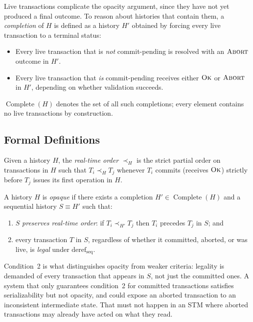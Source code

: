 Live transactions complicate the opacity argument, since they have not yet
produced a final outcome. To reason about histories that contain them, a
\emph{completion} of $H$ is defined as a history $H'$ obtained by forcing
every live transaction to a terminal status:

\begin{itemize}
  \item Every live transaction that is \emph{not} commit-pending is resolved
        with an $\textsc{Abort}$ outcome in $H'$.
  \item Every live transaction that \emph{is} commit-pending receives either
        $\textsc{Ok}$ or $\textsc{Abort}$ in $H'$, depending on whether
        validation succeeds.
\end{itemize}

$\operatorname{Complete}(H)$ denotes the set of all such completions; every
element contains no live transactions by construction.

\subsection{Formal Definitions}
\label{subsec:opacity-defs}

\begin{definition}
  \label{def:rt-order}
  Given a history $H$, the \emph{real-time order} $\prec_H$ is the strict
  partial order on transactions in $H$ such that $T_i \prec_H T_j$ whenever
  $T_i$ commits (receives $\textsc{Ok}$) strictly before $T_j$ issues its
  first operation in $H$.
\end{definition}

\begin{definition}
  \label{def:opacity}
  A history $H$ is \emph{opaque} if there exists a completion
  $H' \in \operatorname{Complete}(H)$ and a sequential history $S \equiv H'$
  such that:
  \begin{enumerate}
    \item $S$ \emph{preserves real-time order}: if $T_i \prec_{H'} T_j$ then
          $T_i$ precedes $T_j$ in $S$; and
    \item every transaction $T$ in $S$, regardless of whether it committed,
          aborted, or was live, is \emph{legal} under
          $\text{deref}_{\mathrm{seq}}$.
  \end{enumerate}
\end{definition}

Condition~2 is what distinguishes opacity from weaker criteria: legality is
demanded of every transaction that appears in $S$, not just the committed
ones. A system that only guarantees condition~2 for committed transactions
satisfies serializability but not opacity, and could expose an aborted
transaction to an inconsistent intermediate state. That must not happen in an
STM where aborted transactions may already have acted on what they read.

